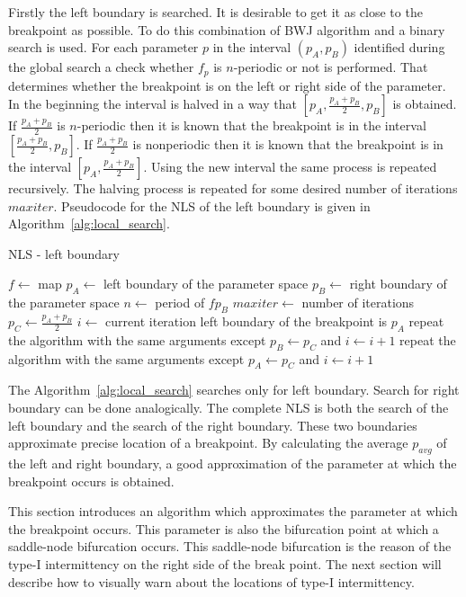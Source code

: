 \par
Firstly the left boundary is searched.
It is desirable to get it as close to the breakpoint as possible.
To do this combination of BWJ algorithm and a binary search is used.
For each parameter $p$ in the interval $(p_{A}, p_{B})$ identified during the global search a check whether $f_{p}$ is $n$-periodic or not is performed.
That determines whether the breakpoint is on the left or right side of the parameter.
In the beginning the interval is halved in a way that $[p_{A}, \frac{p_{A}+p_{B}}{2}, p_{B}]$ is obtained.
If $\frac{p_{A}+p_{B}}{2}$ is $n$-periodic then it is known that the breakpoint is in the interval $[\frac{p_{A}+p_{B}}{2}, p_{B}]$.
If $\frac{p_{A}+p_{B}}{2}$ is nonperiodic then it is known that the breakpoint is in the interval $[p_{A}, \frac{p_{A}+p_{B}}{2}]$.
Using the new interval the same process is repeated recursively.
The halving process is repeated for some desired number of iterations $maxiter$.
Pseudocode for the NLS of the left boundary is given in Algorithm~\ref{alg:local_search}.

\begin{algorithm}[!h]
    \caption{NLS - left boundary}
    \label{alg:local_search}
    \begin{algorithmic}[1]
        \Statex $f \gets$ map
        \Statex $p_{A} \gets$ left boundary of the parameter space
        \Statex $p_{B} \gets$ right boundary of the parameter space
        \Statex $n \gets$ period of $f{p_{B}}$
        \Statex $maxiter \gets$ number of iterations
        \State $p_{C} \gets \frac{p_{A}+p_{B}}{2}$
        \State $i \gets$ current iteration
            \State left boundary of the breakpoint is $p_{A}$
        \EndIf
            \State repeat the algorithm with the same arguments except $p_{B} \gets p_{C}$ and $i \gets i+1$
        \Else
            \State repeat the algorithm with the same arguments except $p_{A} \gets p_{C}$ and $i \gets i+1$
        \EndIf
    \end{algorithmic}
\end{algorithm}

\par
The Algorithm~\ref{alg:local_search} searches only for left boundary. Search for right boundary can be done analogically.
The complete NLS is both the search of the left boundary and the search of the right boundary.
These two boundaries approximate precise location of a breakpoint.
By calculating the average $p_{avg}$ of the left and right boundary, a good approximation of the parameter at which the breakpoint occurs is obtained.
\par
This section introduces an algorithm which approximates the parameter at which the breakpoint occurs.
This parameter is also the bifurcation point at which a saddle-node bifurcation occurs.
This saddle-node bifurcation is the reason of the type-I intermittency on the right side of the break point.
The next section will describe how to visually warn about the locations of type-I intermittency.

